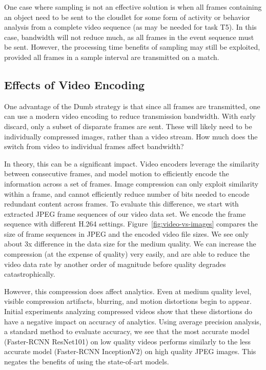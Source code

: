 One case where sampling is not an effective solution is when all
frames containing an object need to be sent to the cloudlet for
some form of activity or behavior analysis from a complete video
sequence (as may be needed for task T5).  In this case, bandwidth
will not reduce much, as all frames in the event sequence must be
sent.  However, the processing time benefits of sampling may
still be exploited, provided all frames in a sample interval are
transmitted on a match.  


\subsection{Effects of Video Encoding}

One advantage of the {\xc Dumb} strategy is that since all
frames are transmitted, one can use a modern video encoding to
reduce transmission bandwidth.  With early discard, only a subset
of disparate frames are sent.  These will likely need to be
individually compressed images, rather than a video stream.  How
much does the switch from video to individual frames affect
bandwidth?  

In theory, this can be a significant impact. Video encoders leverage the
similarity between consecutive frames, and model motion to efficiently encode
the information across a set of frames. Image compression can only exploit
similarity within a frame, and cannot efficiently reduce number of bits needed
to encode redundant content across frames. To evaluate this difference, we start
with extracted JPEG frame sequences of our video data set. We encode the frame
sequence with different H.264 settings. Figure~\ref{fig:video-vs-images}
compares the size of frame sequences in JPEG and the encoded video file sizes.
We see only about 3x difference in the data size for the medium quality. We can
increase the compression (at the expense of quality) very easily, and are able
to reduce the video data rate by another order of magnitude before quality
degrades catastrophically.

However, this compression does affect analytics. Even at medium quality level,
visible compression artifacts, blurring, and motion distortions begin to appear.
Initial experiments analyzing compressed videos show that these distortions do
have a negative impact on accuracy of analytics. Using average precision
analysis, a standard method to evaluate accuracy, we see that the 
most accurate model (Faster-RCNN ResNet101) on low quality videos performs similarly
to the less accurate model (Faster-RCNN InceptionV2) on high quality
JPEG images. This negates the benefits of using the state-of-art models.

